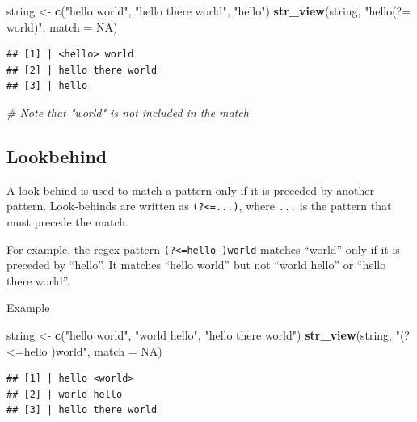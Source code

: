 \documentclass[
]{book}
\newenvironment{Shaded}{\begin{snugshade}}{\end{snugshade}}
\newcommand{\AttributeTok}[1]{\textcolor[rgb]{0.13,0.29,0.53}{#1}}
\newcommand{\CommentTok}[1]{\textcolor[rgb]{0.56,0.35,0.01}{\textit{#1}}}
\newcommand{\ConstantTok}[1]{\textcolor[rgb]{0.56,0.35,0.01}{#1}}
\newcommand{\FunctionTok}[1]{\textcolor[rgb]{0.13,0.29,0.53}{\textbf{#1}}}
\newcommand{\NormalTok}[1]{#1}
\newcommand{\OtherTok}[1]{\textcolor[rgb]{0.56,0.35,0.01}{#1}}
\newcommand{\StringTok}[1]{\textcolor[rgb]{0.31,0.60,0.02}{#1}}
\begin{document}
\begin{Shaded}
\begin{Highlighting}[]
\NormalTok{string }\OtherTok{\textless{}{-}} \FunctionTok{c}\NormalTok{(}\StringTok{"hello world"}\NormalTok{, }\StringTok{"hello there world"}\NormalTok{, }\StringTok{"hello"}\NormalTok{)}
\FunctionTok{str\_view}\NormalTok{(string, }\StringTok{"hello(?= world)"}\NormalTok{, }\AttributeTok{match =} \ConstantTok{NA}\NormalTok{)}
\end{Highlighting}
\end{Shaded}

\begin{verbatim}
## [1] | <hello> world
## [2] | hello there world
## [3] | hello
\end{verbatim}

\begin{Shaded}
\begin{Highlighting}[]
\CommentTok{\# Note that "world" is not included in the match}
\end{Highlighting}
\end{Shaded}

\hypertarget{lookbehind}{%
\subsection{Lookbehind}\label{lookbehind}}

A look-behind is used to match a pattern only if it is preceded by another pattern. Look-behinds are written as \texttt{(?\textless{}=...)}, where \texttt{...} is the pattern that must precede the match.

For example, the regex pattern \texttt{(?\textless{}=hello\ )world} matches ``world'' only if it is preceded by ``hello''. It matches ``hello world'' but not ``world hello'' or ``hello there world''.

Example

\begin{Shaded}
\begin{Highlighting}[]
\NormalTok{string }\OtherTok{\textless{}{-}} \FunctionTok{c}\NormalTok{(}\StringTok{"hello world"}\NormalTok{, }\StringTok{"world hello"}\NormalTok{, }\StringTok{"hello there world"}\NormalTok{)}
\FunctionTok{str\_view}\NormalTok{(string, }\StringTok{"(?\textless{}=hello )world"}\NormalTok{, }\AttributeTok{match =} \ConstantTok{NA}\NormalTok{)}
\end{Highlighting}
\end{Shaded}

\begin{verbatim}
## [1] | hello <world>
## [2] | world hello
## [3] | hello there world
\end{verbatim}
\end{document}
